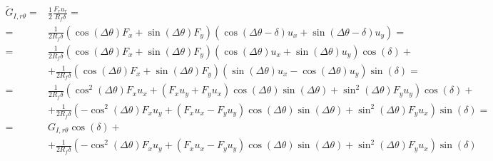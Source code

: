 \documentclass[a4paper]{jpconf}
\begin{document}
\begin{equation}
\begin{split}
\widetilde{G}_{I,r\theta} = &\frac{1}{2}\frac{F_{r}u_{r}}{R_{f}\delta}=\\
= &\frac{1}{2R_{f}\delta}\left(\cos\left(\Delta\theta\right) F_{x}+\sin\left(\Delta\theta\right)F_{y}\right)\left(\cos\left(\Delta\theta-\delta\right) u_{x}+\sin\left(\Delta\theta-\delta\right) u_{y}\right)=\\
= &\frac{1}{2R_{f}\delta}\left(\cos\left(\Delta\theta\right) F_{x}+\sin\left(\Delta\theta\right)F_{y}\right)\left(\cos\left(\Delta\theta\right) u_{x}+\sin\left(\Delta\theta\right) u_{y}\right)\cos\left(\delta\right)+\\
&+\frac{1}{2R_{f}\delta}\left(\cos\left(\Delta\theta\right) F_{x}+\sin\left(\Delta\theta\right)F_{y}\right)\left(\sin\left(\Delta\theta\right) u_{x}-\cos\left(\Delta\theta\right) u_{y}\right)\sin\left(\delta\right)=\\
= &\frac{1}{2R_{f}\delta}\left(\cos^{2}\left(\Delta\theta\right) F_{x}u_{x}+\left(F_{x}u_{y}+F_{y}u_{x}\right)\cos\left(\Delta\theta\right)\sin\left(\Delta\theta\right)+\sin^{2}\left(\Delta\theta\right)F_{y}u_{y}\right)\cos\left(\delta\right)+\\
&+\frac{1}{2R_{f}\delta}\left(-\cos^{2}\left(\Delta\theta\right) F_{x}u_{y}+\left(F_{x}u_{x}-F_{y}u_{y}\right)\cos\left(\Delta\theta\right)\sin\left(\Delta\theta\right)+\sin^{2}\left(\Delta\theta\right)F_{y}u_{x}\right)\sin\left(\delta\right)=\\
= &G_{I,r\theta}\cos\left(\delta\right)+\\
&+\frac{1}{2R_{f}\delta}\left(-\cos^{2}\left(\Delta\theta\right) F_{x}u_{y}+\left(F_{x}u_{x}-F_{y}u_{y}\right)\cos\left(\Delta\theta\right)\sin\left(\Delta\theta\right)+\sin^{2}\left(\Delta\theta\right)F_{y}u_{x}\right)\sin\left(\delta\right)
\end{split}
\end{equation}
\end{document}
